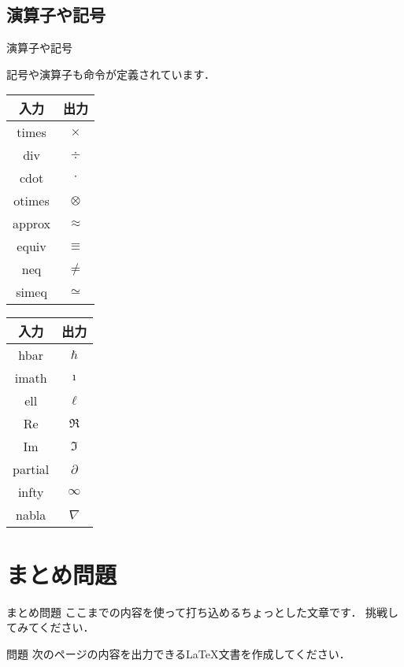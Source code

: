 \documentclass[slide,dvipdfmx]{beamer}
\newcommand{\bs}{\texttt{\symbol{"5C}}}
\begin{document}
\subsection{演算子や記号}
\begin{frame}{演算子や記号}

記号や演算子も命令が定義されています．

\begin{multicols}{2}

\begin{tabular}{|c|c|} \hline
入力 & 出力 \\ \hline
\bs times & $\times$ \\ \hline
\bs div & $\div$ \\ \hline
\bs cdot & $\cdot$ \\ \hline
\bs otimes & $\otimes$ \\ \hline
\bs approx & $\approx$ \\ \hline
\bs equiv & $\equiv$ \\ \hline
\bs neq & $\neq$ \\ \hline
\bs simeq & $\simeq$ \\ \hline
\end{tabular}

\begin{tabular}{|c|c|} \hline
入力 & 出力 \\ \hline
\bs hbar & $\hbar$ \\ \hline
\bs imath & $\imath$ \\ \hline
\bs ell & $\ell$ \\ \hline
\bs Re & $\Re$ \\ \hline
\bs Im & $\Im$ \\ \hline
\bs partial & $\partial$ \\ \hline
\bs infty & $\infty$ \\ \hline
\bs nabla & $\nabla$ \\ \hline
\end{tabular}
\end{multicols}
\end{frame}


\section{まとめ問題}
\begin{frame}{まとめ問題}
ここまでの内容を使って打ち込めるちょっとした文章です．
挑戦してみてください．
\begin{itembox}[l]{問題}
次のページの内容を出力できる\LaTeX 文書を作成してください．
\end{itembox}
\end{frame}
\end{document}
